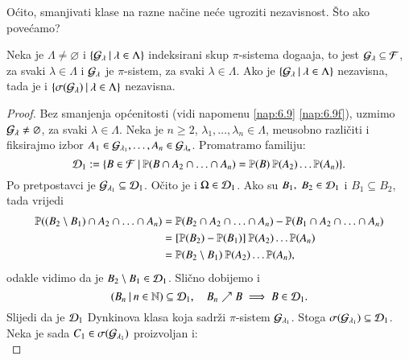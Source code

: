 O\' cito, smanjivati klase na razne na\v cine ne\' ce ugroziti nezavisnost.
\v Sto ako pove\' camo?

\begin{tm}  \label{tm:6.10}
    Neka je $\Lambda \neq \varnothing$ i $\{{\mathcal{G}_\lambda} \: | \: {\lambda \in \Lambda}\}$ indeksirani skup $\pi$-sistema doga\dj aja, to jest $\mathcal{G}_\lambda \subseteq \mathcal{F}$, za svaki $\lambda \in \Lambda$ i $\mathcal{G}_\lambda$ je $\pi$-sistem, za svaki $\lambda \in \Lambda$.
    Ako je $\{{\mathcal{G}_\lambda} \: | \: {\lambda \in \Lambda}\}$ nezavisna, tada je i $\{{\sigma({\mathcal{G}_\lambda})} \: | \: {\lambda \in \Lambda}\}$ nezavisna.
\end{tm}

\begin{proof}
    Bez smanjenja op\' cenitosti (vidi napomenu \ref{nap:6.9} \ref{nap:6.9f}), uzmimo $\mathcal{G}_\lambda \neq \varnothing$, za svaki $\lambda \in \Lambda$.
    Neka je $n \geq 2$, $\lambda_1, \ldots, \lambda_n \in \Lambda$, me\dj usobno razli\v citi i fiksirajmo izbor $A_1 \in \mathcal{G}_{\lambda_1}, \ldots, A_n \in \mathcal{G}_{\lambda_n}$.
    Promatramo familiju:
    \begin{equation*}
        \mathcal{D}_1 := \{{B \in \mathcal{F}} \: | \: {\mathbb{P}({B \cap A_2 \cap \ldots \cap A_n}) = \mathbb{P}({B}) \: \mathbb{P}({A_2}) \ldots \mathbb{P}({A_n})}\}.
    \end{equation*}
    Po pretpostavci je $\mathcal{G}_{\lambda_1} \subseteq \mathcal{D}_1$.
    O\v cito je i $\Omega \in \mathcal{D}_1$.
    Ako su $B_1, \; B_2 \in \mathcal{D}_1$ i $B_1 \subseteq B_2$, tada vrijedi
    \begin{align*}
        \mathbb{P}({(B_2 \setminus B_1) \cap A_2 \cap \ldots \cap A_n}) &= \mathbb{P}({B_2 \cap A_2 \cap \ldots \cap A_n}) - \mathbb{P}({B_1 \cap A_2 \cap \ldots \cap A_n}) \\
        &= [\mathbb{P}({B_2}) - \mathbb{P}({B_1})] \: \mathbb{P}({A_2}) \ldots \mathbb{P}({A_n})\\
        &= \mathbb{P}({B_2 \setminus B_1}) \: \mathbb{P}({A_2}) \ldots \mathbb{P}({A_n}),
    \end{align*}
    odakle vidimo da je $B_2 \setminus B_1 \in \mathcal{D}_1$.
    Sli\v cno dobijemo i
    \begin{equation*}
        ({B_n} \: | \: {n \in \mathbb{N}}) \subseteq \mathcal{D}_1, \quad B_n \nearrow B \implies B \in \mathcal{D}_1.
    \end{equation*}
    Slijedi da je $\mathcal{D}_1$ Dynkinova klasa koja sadr\v zi $\pi$-sistem $\mathcal{G}_{\lambda_1}$.
    Stoga $\sigma({\mathcal{G}_{\lambda_1}}) \subseteq \mathcal{D}_1$.
    Neka je sada $C_1 \in \sigma({\mathcal{G}_{\lambda_1}})$ proizvoljan i:
    \begin{equation*}

\end{equation*}
\end{proof}

